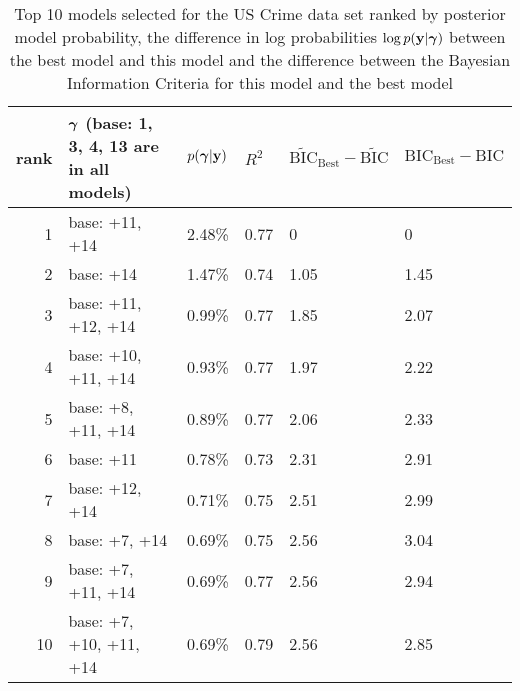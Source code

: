 \documentclass{amsart}
\begin{document}
\begin{table}
\label{tab:numerical_results_uscrime}
\caption{Top 10 models selected for the US Crime data set ranked by posterior model probability, the
					difference in log probabilities $\log p({\bf y}|{\boldsymbol \gamma})$ between the best model and this model and the difference between the Bayesian Information Criteria for this model and the best model}
\begin{center}
\begin{tabular}{r|l|l|l|l|l}
rank & ${\boldsymbol \gamma}$ (base: 1, 3, 4, 13 are in all models)& $p({\boldsymbol \gamma}|{\bf y})$ & $R^2$ & $\widetilde{\text{BIC}}_\text{Best} - \widetilde{\text{BIC}}$ & $\text{BIC}_\text{Best} - \text{BIC}$ \\
\hline
1 & base: +11, +14&  2.48\%&  0.77&  0&  0\\
2 & base: +14&  1.47\%&  0.74&  1.05&  1.45\\
3 & base: +11, +12, +14&  0.99\%&  0.77&  1.85&  2.07\\
4 & base: +10, +11, +14&  0.93\%&  0.77&  1.97&  2.22\\
5 & base: +8, +11, +14&  0.89\%&  0.77&  2.06&  2.33\\
6 & base: +11&  0.78\%&  0.73&  2.31&  2.91\\
7 & base: +12, +14&  0.71\%&  0.75&  2.51&  2.99\\
8 & base: +7, +14&  0.69\%&  0.75&  2.56&  3.04\\
9 & base: +7, +11, +14&  0.69\%&  0.77&  2.56&  2.94\\
10 & base: +7, +10, +11, +14&  0.69\%&  0.79&  2.56&  2.85\\
\end{tabular}
\end{center}
\end{table}
\end{document}

